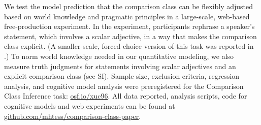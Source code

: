 \documentclass[doc, floatsintext]{apa6}
\newcommand{\mht}[1]{\textcolor{Blue}{[mht: #1]}}
\begin{document}
We test the model prediction that the comparison class can be flexibly adjusted based on world knowledge and pragmatic principles in a large-scale, web-based free-production experiment.
In the experiment, participants rephrase a speaker's statement, which involves a scalar adjective, in a way that makes the comparison class explicit.
(A smaller-scale, forced-choice version of this task was reported in .)
To norm world knowledge needed in our quantitative modeling, we also measure truth judgments for statements involving scalar adjectives and an explicit comparison class (see SI).
Sample size, exclusion criteria, regression analysis, and cognitive model analysis were preregistered for the Comparison Class Inference task: \url{osf.io/xuc96}.
All data reported, analysis scripts, code for cognitive models and web experiments can be found at \url{github.com/mhtess/comparison-class-paper}.









%
%
%
\end{document}
